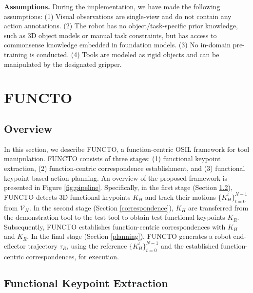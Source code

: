 \noindent \textbf{Assumptions.} During the implementation, we have made the following assumptions: (1) Visual observations are single-view and do not contain any action annotations. (2) The robot has no object/task-specific prior knowledge, such as 3D object models or manual task constraints, but has access to commonsense knowledge embedded in foundation models. (3) No in-domain pre-training is conducted. (4) Tools are modeled as rigid objects and can be manipulated by the designated gripper. 


\section{FUNCTO}


\subsection{Overview}

In this section, we describe FUNCTO, a function-centric OSIL framework for tool manipulation. FUNCTO consists of three stages: (1) functional keypoint extraction, (2) function-centric correspondence establishment, and (3) functional keypoint-based action planning. An overview of the proposed framework is presented in Figure \ref{fig:pipeline}. Specifically, in the first stage (Section \ref{detection}), FUNCTO detects 3D functional keypoints $K_H$ and track their motions $\{K_H^t\}_{t=0}^{N-1}$ from $\mathcal{V}_H$. In the second stage (Section \ref{correspondence}), $K_H$ are transferred from the demonstration tool to the test tool to obtain test functional keypoints $K_R$. Subsequently, FUNCTO establishes function-centric correspondences with $K_H$ and $K_R$. In the final stage (Section \ref{planning}), FUNCTO generates a robot end-effector trajectory $\tau_R$, using the reference $\{K_H^t\}_{t=0}^{N-1}$ and the established function-centric correspondences, for execution.


\subsection{Functional Keypoint Extraction}\label{detection}

